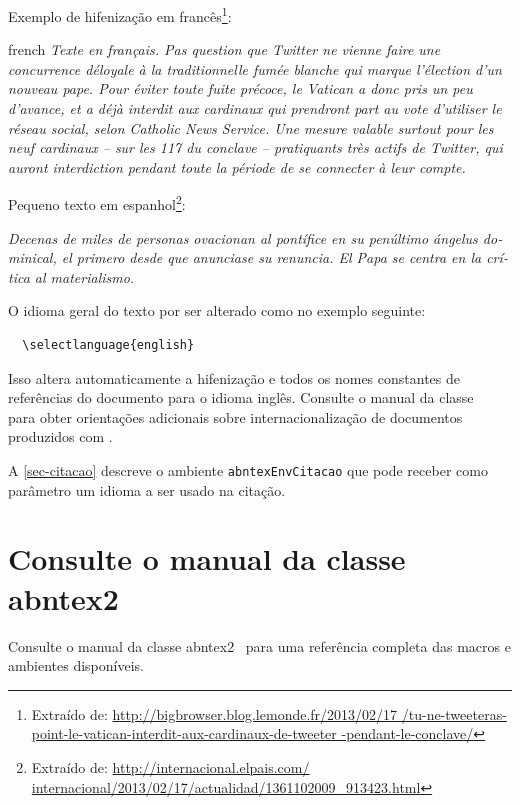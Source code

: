 Exemplo de hifenização em francês\footnote{Extraído de:
\url{http://bigbrowser.blog.lemonde.fr/2013/02/17
     /tu-ne-tweeteras-point-le-vatican-interdit-aux-cardinaux-de-tweeter
     -pendant-le-conclave/}
}:

\begin{otherlanguage*}{french}
\textit{Texte en français. Pas question que Twitter ne vienne faire une
concurrence déloyale à la traditionnelle fumée blanche qui mar\-que l'élection
d'un nouveau pape. Pour éviter toute fuite précoce, le Vatican a donc pris un
peu d'avance, et a déjà interdit aux cardinaux qui prendront part au vote
d'utiliser le réseau social, selon Catholic News Service. Une mesure valable
surtout pour les neuf cardinaux – sur les 117 du conclave – pratiquants très
actifs de Twitter, qui auront interdiction pendant toute la période de se
connecter à leur compte. }
\end{otherlanguage*}

Pequeno texto em espanhol\footnote{Extraído de:
\url{http://internacional.elpais.com/
     internacional/2013/02/17/actualidad/1361102009_913423.html}
}:

\foreignlanguage{spanish}{%
  \textit{%
    Decenas de miles de personas ovacionan al
    pontífice en su penúltimo ángelus dominical, el primero desde que anunciase su
    renuncia. El Papa se centra en la crítica al materialismo.
  }%
}

O idioma geral do texto por ser alterado como no exemplo seguinte:

\begin{verbatim}
  \selectlanguage{english}
\end{verbatim}

Isso altera automaticamente a hifenização e todos os nomes constantes de
referências do documento para o idioma inglês. Consulte o manual da classe
~\cite{abntex2classe} para obter orientações adicionais sobre internacionalização
de documentos produzidos com \abnTeX{}.

A \autoref{sec-citacao} descreve o ambiente \texttt{abntexEnvCitacao} que pode receber
como parâmetro um idioma a ser usado na citação.

\section{Consulte o manual da classe \textsf{abntex2}}

Consulte o manual da classe \textsf{abntex2}~\cite{abntex2classe} para uma
referência completa das macros e ambientes disponíveis.

